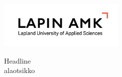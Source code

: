 
\usepackage{geometry}


\theoremstyle{plain}
\newtheorem{theorem}{Lause}
\newtheorem{lemma}{Lemma}
\newtheorem{corollary}{Seuraus}
%
\theoremstyle{definition}
\newtheorem{definition}{M\"a\"aritelm\"a}
\newtheorem{example}{Esimerkki}
%
\theoremstyle{remark}
\newtheorem{remark}{Huomautus}


\newcommand{\tekija}{{Noora Angelva}} %
\newcommand{\Ohjaajat}{{Maisa Mielikäinen ja Tuija x}} %
\newcommand{\Toimeksiantaja}{{Yhtiö X}} %
\newcommand{\titteli}{{ }} %
\newcommand{\otsikko}{{Headline}}   %
\newcommand{\tutkielma}{{Thesis}}
\newcommand{\opinnaytetyo}{{Opinäytetyö}} %
\newcommand{\aika}{{2021}}   %
\newcommand{\tutkintonimike}{{Engineer of Information and Communication Technology}}
\newcommand{\tutkintonimikeFin}{{Tieto- ja viestintätekniikan insinööri}}
\newcommand{\Koulutus}{{Engineer (Bachelor)}}
\newcommand{\KoulutusFin}{{Insinööri (AMK)}}
\newcommand{\koulutus}{{Koulutus}} %
\newcommand{\alaotsikko}{{alaotsikko}}
\newcommand{\taustaprojekti}{{mahd. taustaprojekti}}


\pagestyle{empty}  %

\begin{center}
\includegraphics[width=6cm]{UAS_Logo}
\end{center}

\vspace{8.5cm}
\begin{center}\fontsize{16pt}{1pt}\selectfont
\otsikko \\ 
\vspace{0.7cm}
\fontsize{14pt}{1pt}\selectfont
\alaotsikko
\end{center}


